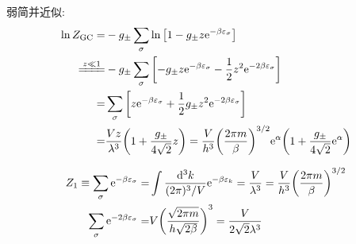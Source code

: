 弱简并近似: \begin{align*}
    \ln{Z_{\text{GC}}} = & - g_{\pm} \sum_{\sigma} \ln \qty[1 - g_{\pm} z \mathrm{e}^{- \beta \varepsilon_{\sigma}}]                                                                                                   \\
    \xlongequal{z \ll 1} & - g_{\pm} \sum_{\sigma} \qty[- g_{\pm} z \mathrm{e}^{- \beta \varepsilon_{\sigma}} - \frac{1}{2} z^2 \mathrm{e}^{- 2 \beta \varepsilon_{\sigma}}]                                           \\
    =                    & \sum_{\sigma} \qty[z \mathrm{e}^{- \beta \varepsilon_{\sigma}} + \frac{1}{2} g_{\pm} z^2 \mathrm{e}^{- 2 \beta \varepsilon_{\sigma}}]                                                       \\
    =                    & \frac{V z}{\lambda^3} \qty(1 + \frac{g_{\pm}}{4 \sqrt{2}} z) = \frac{V}{h^3} \qty(\frac{2 \pi m}{\beta})^{3/2} \mathrm{e}^{\alpha} \qty(1 + \frac{g_{\pm}}{4 \sqrt{2}} \mathrm{e}^{\alpha})
\end{align*}
\begin{framed}
    \begin{align*}
        Z_1 \equiv \sum_{\sigma} \mathrm{e}^{- \beta \varepsilon_{\sigma}} = & \int \frac{\dd[3]{k}}{(2 \pi)^3 / V} \mathrm{e}^{- \beta \varepsilon_k} = \frac{V}{\lambda^3} = \frac{V}{h^3} \qty(\frac{2 \pi m}{\beta})^{3/2} \\
        \sum_{\sigma} \mathrm{e}^{- 2 \beta \varepsilon_{\sigma}} =          & V \qty(\frac{\sqrt{2 \pi m}}{h \sqrt{2 \beta}})^{3} = \frac{V}{2 \sqrt{2} \lambda^3}
    \end{align*}
\end{framed}

